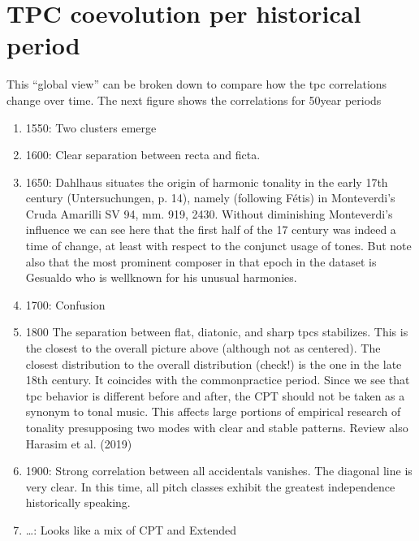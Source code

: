 \documentclass[letterpaper,10pt,english]{sphinxmanual}
\begin{document}
\section{TPC coevolution per historical period}
\label{\detokenize{coevolution:tpc-coevolution-per-historical-period}}
\sphinxAtStartPar
This “global view” can be broken down to compare how the tpc
correlations change over time. The next figure shows the correlations
for 50\sphinxhyphen{}year periods
\begin{enumerate}
%
\item {} 
\sphinxhyphen{}1550: Two clusters emerge

\item {} 
\sphinxhyphen{}1600: Clear separation between recta and ficta.

\item {} 
\sphinxhyphen{}1650: Dahlhaus situates the origin of harmonic tonality in the
early 17th century (Untersuchungen, p. 14), namely (following Fétis)
in Monteverdi’s Cruda Amarilli SV 94, mm. 9\sphinxhyphen{}19, 24\sphinxhyphen{}30. Without
diminishing Monteverdi’s influence we can see here that the first
half of the 17 century was indeed a time of change, at least with
respect to the conjunct usage of tones. But note also that the most
prominent composer in that epoch in the dataset is Gesualdo who is
well\sphinxhyphen{}known for his unusual harmonies.

\item {} 
\sphinxhyphen{}1700: Confusion

\item {} 
\sphinxhyphen{}1800 The separation between flat, diatonic, and sharp tpcs
stabilizes. This is the closest to the overall picture above
(although not as centered). The closest distribution to the overall
distribution (check!) is the one in the late 18th century. It
coincides with the common\sphinxhyphen{}practice period. Since we see that tpc
behavior is different before and after, the CPT should not be taken
as a synonym to tonal music. This affects large portions of empirical
research of tonality presupposing two modes with clear and stable
patterns. Review also Harasim et al. (2019)

\item {} 
\sphinxhyphen{}1900: Strong correlation between all accidentals vanishes. The
diagonal line is very clear. In this time, all pitch classes exhibit
the greatest independence historically speaking.

\item {} 
\sphinxhyphen{}…: Looks like a mix of CPT and Extended

\end{enumerate}
\end{document}
